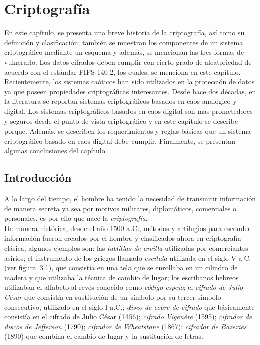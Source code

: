 

\chapter{Criptografía}
En este capítulo, se presenta una breve historia de la criptografía, así como su definición y clasificación; también se muestran los componentes de un sistema criptográfico mediante un esquema y además, se mencionan las tres formas de vulnerarlo. Los datos cifrados deben cumplir con cierto grado de aleatoriedad de acuerdo con el estándar FIPS 140-2, los cuales, se menciona en este capítulo. Recientemente, los sistemas caóticos han sido utilizados en la protección de datos ya que poseen propiedades criptográficas interesantes. Desde hace dos décadas, en la literatura se reportan sistemas criptográficos basados en caos analógico y digital. Los sistemas criptográficos basados en caos digital son mas prometedores y seguros desde el punto de vista criptográfico y en este capítulo se describe porque. Además, se describen los requerimientos y reglas básicas que un sistema criptográfico basado en caos digital debe cumplir. Finalmente, se presentan algunas conclusiones del capítulo.  \\

\section{Introducción}
A lo largo del tiempo, el hombre ha tenido la necesidad de transmitir información de manera secreta ya sea por motivos militares, diplomáticos, comerciales o personales, es por ello que nace la \textit{criptografía}.\\

De manera histórica, desde el año 1500 a.C., métodos y artilugios para esconder información fueron creados por el hombre y clasificados ahora en criptografía clásica, algunos ejemplos son: las \textit{tablillas de arcilla} utilizadas por comerciantes asirios; el instrumento de los griegos llamado \textit{escítala} utilizada en el siglo V a.C. (ver figura~3.1), que consistía en una tela que se enrollaba en un cilindro de madera y que utilizaba la técnica de cambio de lugar; los escribanos hebreos utilizaban el alfabeto al revés conocido como \textit{código espejo}; el \textit{cifrado de Julio César} que consistía en sustitución de un símbolo por su tercer símbolo consecutivo, utilizado en el siglo I a.C.; \textit{disco de cobre de cifrado} que básicamente consistía en el cifrado de Julio César (1466); \textit{cifrado Vigen\`ere} (1595); \textit{cifrador de discos de Jefferson} (1790); \textit{cifrador de Wheatstone} (1867); \textit{cifrador de Bazeries} (1890) que combina el cambio de lugar y la sustitución de letras. \\ 


